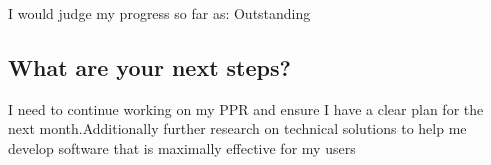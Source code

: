 I would judge my progress so far as: Outstanding

\subsection*{What are your next steps?}
I need to continue working on my PPR and ensure I have a clear plan for the next month.Additionally further research on technical solutions to help me develop software that is maximally effective for my users




